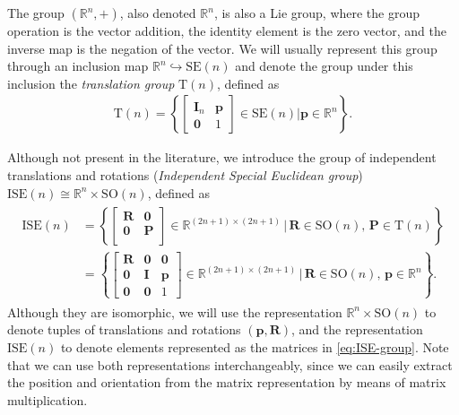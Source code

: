 \begin{example}\label{ex:translation-group}
    The group $(\mathbb{R}^n,+)$, also denoted $\mathbb{R}^n$, is also a Lie group, where the group operation is the vector addition, the identity element is the zero vector, and the inverse map is the negation of the vector. We will usually represent this group through an inclusion map $\mathbb{R}^n \hookrightarrow \text{SE}(n)$ and denote the group under this inclusion the \emph{translation group} $\text{T}(n)$, defined as
    \begin{align}
        \text{T}(n) = \left\{\begin{bmatrix}
            \mathbf{I}_n & \mathbf{p} \\ \mathbf{0} & 1
        \end{bmatrix} \in \text{SE}(n) | \mathbf{p}\in\mathbb{R}^n\right\}.
    \end{align}
\end{example}
\begin{example}\label{ex:independent-translation-rotation-ISE}
    Although not present in the literature, we introduce the group of independent translations and rotations (\emph{Independent Special Euclidean group}) $\text{ISE}(n)\cong\mathbb{R}^n\times\text{SO}(n)$, defined as
    \begin{align}
        \begin{split}
            \text{ISE}(n) &= \left\{\begin{bmatrix}
            \mathbf{R} & \mathbf{0}\\
            \mathbf{0} & \mathbf{P}\\
            \end{bmatrix}\in\mathbb{R}^{(2n+1)\times(2n+1)}\,|\, \mathbf{R}\in\text{SO}(n),\,\mathbf{P}\in\text{T}(n)\right\}\\
            &= \left\{\begin{bmatrix}
            \mathbf{R} & \mathbf{0} & \mathbf{0}\\
            \mathbf{0} & \mathbf{I} & \mathbf{p}\\
            \mathbf{0} & \mathbf{0} & 1
            \end{bmatrix}\in\mathbb{R}^{(2n+1)\times(2n+1)}\,|\, \mathbf{R}\in\text{SO}(n),\,\mathbf{p}\in\mathbb{R}^n\right\}.
        \end{split} \label{eq:ISE-group}
    \end{align}
    Although they are isomorphic, we will use the representation $\mathbb{R}^n\times \text{SO}(n)$ to denote tuples of translations and rotations $(\mathbf{p},\mathbf{R})$, and the representation $\text{ISE}(n)$ to denote elements represented as the matrices in \eqref{eq:ISE-group}. Note that we can use both representations interchangeably, since we can easily extract the position and orientation from the matrix representation by means of matrix multiplication.
\end{example}

